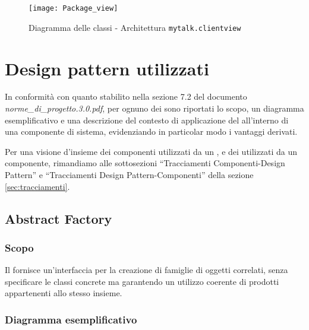 \begin{figure}[H]
  \centering
  \texttt{[image: Package\_view]}
  \caption{Diagramma delle classi - Architettura \texttt{mytalk.clientview}}\label{fig:classclientiew}
\end{figure}
\clearpage

\section{Design pattern utilizzati}
In conformità con quanto stabilito nella sezione 7.2 del documento \textit{norme\_di\_progetto.3.0.pdf}, per ognuno dei  sono riportati lo scopo, un diagramma esemplificativo e una descrizione del contesto di applicazione del  all'interno di una componente di sistema, evidenziando in particolar modo i vantaggi derivati.

Per una visione d'insieme dei componenti utilizzati da un , e dei  utilizzati da un componente, rimandiamo alle sottosezioni ``Tracciamenti Componenti-Design Pattern'' e ``Tracciamenti Design Pattern-Componenti'' della sezione \vref{sec:tracciamenti}.

\subsection{Abstract Factory}
\subsubsection{Scopo}
Il  fornisce un'interfaccia per la creazione di famiglie di oggetti correlati, senza specificare le classi concrete ma garantendo un utilizzo coerente di prodotti appartenenti allo stesso insieme.

\subsubsection{Diagramma esemplificativo}

